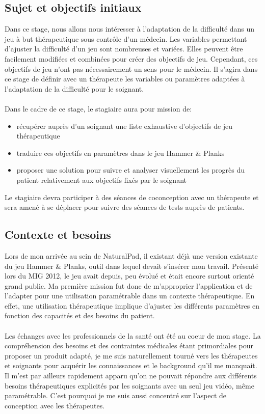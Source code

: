 \subsection{Sujet et objectifs initiaux}
	Dans ce stage, nous allons nous intéresser à l’adaptation de la difficulté dans un jeu à but thérapeutique sous contrôle d’un médecin. Les variables permettant d’ajuster la difficulté d’un jeu sont nombreuses et variées. Elles peuvent être facilement modifiées et combinées pour créer des objectifs de jeu. Cependant, ces objectifs de jeu n’ont pas nécessairement un sens pour le médecin. Il s’agira dans ce stage de définir avec un thérapeute les variables ou paramètres adaptées à l’adaptation de la difficulté pour le soignant.
	\paragraph{}
	Dans le cadre de ce stage, le stagiaire aura pour mission de:
	\begin{itemize}
		\item {récupérer auprès d’un soignant une liste exhaustive d’objectifs de jeu thérapeutique}
		\item {traduire ces objectifs en paramètres dans le jeu Hammer \& Planks}
		\item {proposer une solution pour suivre et analyser visuellement les progrès du patient relativement aux objectifs fixés par le soignant}
	\end{itemize}
	Le stagiaire devra participer à des séances de coconception avec un thérapeute et sera amené à se déplacer pour suivre des séances de tests auprès de patients.
		
\subsection{Contexte et besoins}
Lors de mon arrivée au sein de NaturalPad, il existant déjà une version existante du jeu Hammer \& Planks, outil dans lequel devait s'insérer mon travail. Présenté lors du MIG 2012, le jeu avait depuis, peu évolué et était encore surtout orienté grand public. Ma première mission fut donc de m'approprier l'application et de l'adapter pour une utilisation paramétrable dans un contexte thérapeutique. En effet, une utilisation thérapeutique implique d'ajuster les différents paramètres en fonction des capacités et des besoins du patient.

	\paragraph{}Les échanges avec les professionnels de la santé ont été au coeur de mon stage. La compréhension des besoins et des contraintes médicales étant primordiales pour proposer un produit adapté, je me suis naturellement tourné vers les thérapeutes et soignants pour acquérir les connaissances et le background qu'il me manquait. Il m'est par ailleurs rapidement apparu qu'on ne pouvait répondre aux différents besoins thérapeutiques explicités par les soignants avec un seul jeu vidéo, même paramétrable. C'est pourquoi je me suis aussi concentré sur l'aspect de conception avec les thérapeutes. 

